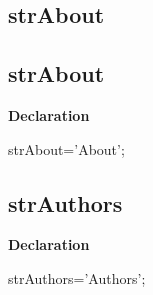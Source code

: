 \documentclass{report}
\newif\ifpdf
\begin{document}
\subsection*{\large{\textbf{strAbout}}\normalsize\hspace{1ex}\hrulefill}
\else
\subsection*{strAbout}
\fi
\label{trstrings-strAbout}
\begin{list}{}{
\setlength{\itemindent}{0cm}
\setlength{\listparindent}{0cm}
\setlength{\leftmargin}{\evensidemargin}
\addtolength{\leftmargin}{\tmplength}
\settowidth{\labelsep}{X}
\addtolength{\leftmargin}{\labelsep}
\setlength{\labelwidth}{\tmplength}
}
\item[\textbf{Declaration}\hfill]
\ifpdf
\begin{flushleft}
\fi
\begin{ttfamily}
strAbout='About';\end{ttfamily}

\ifpdf
\end{flushleft}
\fi

\end{list}
\ifpdf
\subsection*{\large{\textbf{strAuthors}}\normalsize\hspace{1ex}\hrulefill}
\else
\subsection*{strAuthors}
\fi
\label{trstrings-strAuthors}
\begin{list}{}{
\setlength{\itemindent}{0cm}
\setlength{\listparindent}{0cm}
\setlength{\leftmargin}{\evensidemargin}
\addtolength{\leftmargin}{\tmplength}
\settowidth{\labelsep}{X}
\addtolength{\leftmargin}{\labelsep}
\setlength{\labelwidth}{\tmplength}
}
\item[\textbf{Declaration}\hfill]
\ifpdf
\begin{flushleft}
\fi
\begin{ttfamily}
strAuthors='Authors';\end{ttfamily}

\ifpdf
\end{flushleft}
\fi

\end{list}
\ifpdf
\end{document}
